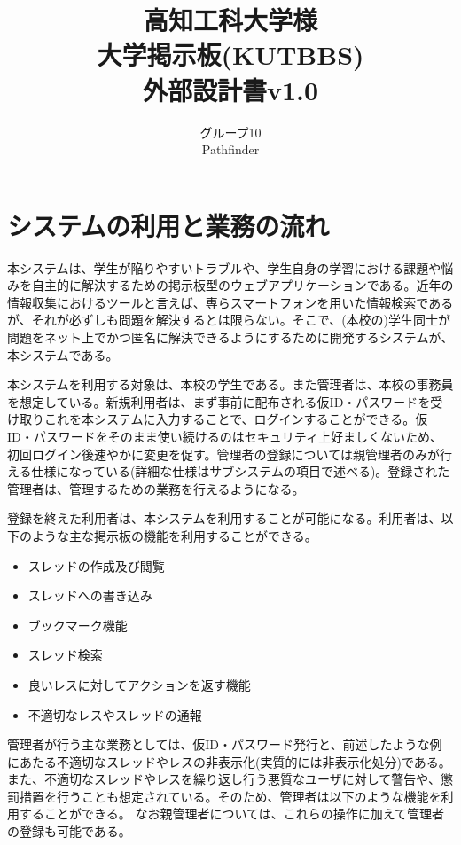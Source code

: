 \documentclass[a4j]{jarticle}
\title{
\vspace{30mm}
{\bf 高知工科大学様}
\\
\vspace{5mm}
大学掲示板(KUTBBS)\\
\vspace{5mm}
{\bf  外部設計書v1.0}
\vspace{90mm}
}
\author{
\vspace{5mm}
グループ10 \\
\vspace{5mm}
Pathfinder \\
\vspace{5mm}
\vspace{10mm}
}
\begin{document}
\maketitle
\tableofcontents
\newpage




\section{システムの利用と業務の流れ}
本システムは、学生が陥りやすいトラブルや、学生自身の学習における課題や悩みを自主的に解決するための掲示板型のウェブアプリケーションである。近年の情報収集におけるツールと言えば、専らスマートフォンを用いた情報検索であるが、それが必ずしも問題を解決するとは限らない。そこで、(本校の)学生同士が問題をネット上でかつ匿名に解決できるようにするために開発するシステムが、本システムである。



本システムを利用する対象は、本校の学生である。また管理者は、本校の事務員を想定している。新規利用者は、まず事前に配布される仮ID・パスワードを受け取りこれを本システムに入力することで、ログインすることができる。仮ID・パスワードをそのまま使い続けるのはセキュリティ上好ましくないため、初回ログイン後速やかに変更を促す。管理者の登録については親管理者のみが行える仕様になっている(詳細な仕様はサブシステムの項目で述べる)。登録された管理者は、管理するための業務を行えるようになる。


登録を終えた利用者は、本システムを利用することが可能になる。利用者は、以下のような主な掲示板の機能を利用することができる。
\begin{itemize}
  \item スレッドの作成及び閲覧
  \item スレッドへの書き込み
  \item ブックマーク機能
  \item スレッド検索
  \item 良いレスに対してアクションを返す機能
  \item 不適切なレスやスレッドの通報
\end{itemize}



管理者が行う主な業務としては、仮ID・パスワード発行と、前述したような例にあたる不適切なスレッドやレスの非表示化(実質的には非表示化処分)である。また、不適切なスレッドやレスを繰り返し行う悪質なユーザに対して警告や、懲罰措置を行うことも想定されている。そのため、管理者は以下のような機能を利用することができる。
なお親管理者については、これらの操作に加えて管理者の登録も可能である。
\end{document}
